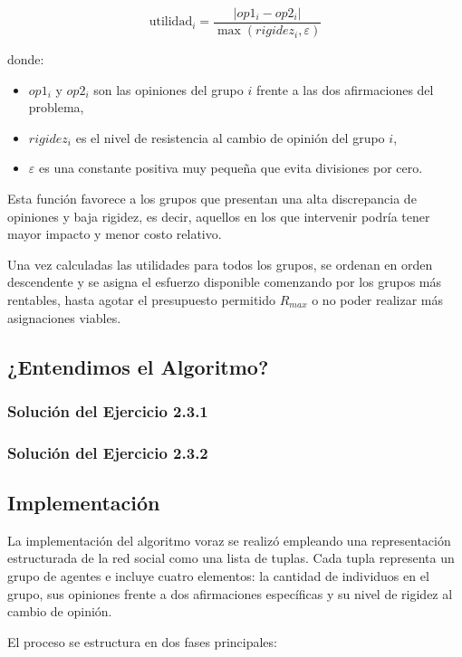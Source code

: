 \documentclass[11pt,letter]{article}
\begin{document}
\[
\text{utilidad}_i = \frac{|op1_i - op2_i|}{\max(rigidez_i, \varepsilon)}
\]

donde:
\begin{itemize}
    \item $op1_i$ y $op2_i$ son las opiniones del grupo $i$ frente a las dos afirmaciones del problema,
    \item $rigidez_i$ es el nivel de resistencia al cambio de opinión del grupo $i$,
    \item $\varepsilon$ es una constante positiva muy pequeña que evita divisiones por cero.
\end{itemize}

Esta función favorece a los grupos que presentan una alta discrepancia de opiniones y baja rigidez, es decir, aquellos en los que intervenir podría tener mayor impacto y menor costo relativo.

Una vez calculadas las utilidades para todos los grupos, se ordenan en orden descendente y se asigna el esfuerzo disponible comenzando por los grupos más rentables, hasta agotar el presupuesto permitido $R_{max}$ o no poder realizar más asignaciones viables.

\subsection{¿Entendimos el Algoritmo?}
\subsubsection{Solución del Ejercicio 2.3.1}
\subsubsection{Solución del Ejercicio 2.3.2}

\subsection{Implementación}

La implementación del algoritmo voraz se realizó empleando una representación estructurada de la red social como una lista de tuplas. Cada tupla representa un grupo de agentes e incluye cuatro elementos: la cantidad de individuos en el grupo, sus opiniones frente a dos afirmaciones específicas y su nivel de rigidez al cambio de opinión.

El proceso se estructura en dos fases principales:
\end{document}
